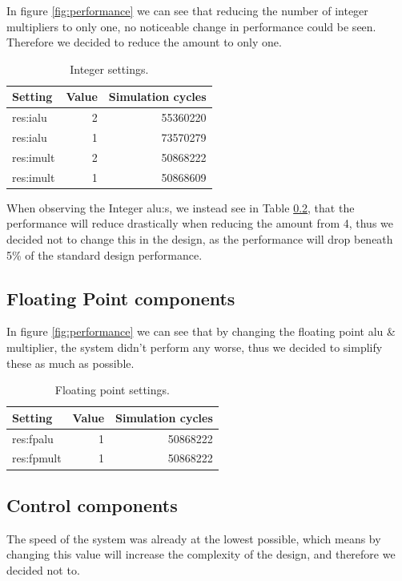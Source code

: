 \documentclass[titlepage, a4paper]{article}
\begin{document}
In figure \ref{fig:performance} we can see that reducing the number of integer multipliers to only one, no noticeable change in performance could be seen. Therefore we decided to reduce the amount to only one.

\begin{table}[H]
\centering
\caption{Integer settings.}

\begin{tabular}{|l|r|r|}
  \hline
  \textbf{Setting} & \textbf{Value} & \textbf{Simulation cycles}\\ \hline
  res:ialu & 2 & 55360220 \\ \hline
  res:ialu & 1 & 73570279 \\ \hline
  res:imult & 2 & 50868222 \\ \hline
  res:imult & 1 & 50868609 \\ \hline
\end{tabular}

\label{tab:integer}
\end{table}

When observing the Integer alu:s, we instead see in Table \ref{}, that the performance will reduce drastically when reducing the amount from 4, thus we decided not to change this in the design, as the performance will drop beneath 5\% of the standard design performance.

\subsection{Floating Point components}
In figure \ref{fig:performance} we can see that by changing the floating point alu \& multiplier, the system didn't perform any worse, thus we decided to simplify these as much as possible.

\begin{table}[H]
\centering
\caption{Floating point settings.}

\begin{tabular}{|l|r|r|}
  \hline
  \textbf{Setting} & \textbf{Value} & \textbf{Simulation cycles}\\ \hline
  res:fpalu & 1 & 50868222 \\ \hline
  res:fpmult & 1 & 50868222 \\ \hline
\end{tabular}

\label{tab:floatingpoint}
\end{table}

\subsection{Control components}
The speed of the system was already at the lowest possible, which means by changing this value will increase the complexity of the design, and therefore we decided not to.
\end{document}

